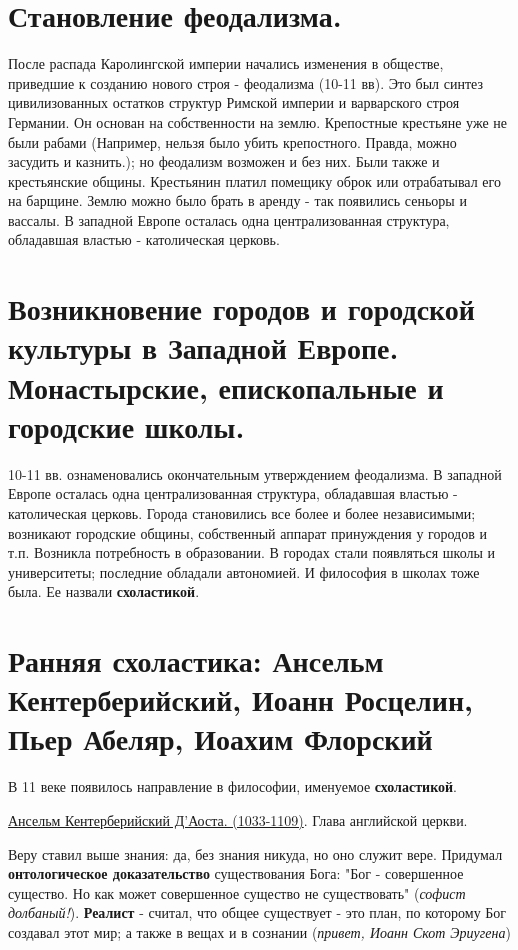 \documentclass[12pt,a4paper]{article}
\begin{document}
\section{Становление феодализма.}
После распада Каролингской империи начались изменения в обществе, приведшие к созданию нового строя - феодализма (10-11 вв). Это был синтез цивилизованных остатков структур Римской империи и варварского строя Германии. 
Он основан на собственности на землю. Крепостные крестьяне уже не были рабами (Например, нельзя было убить крепостного. Правда, можно засудить и казнить.); но феодализм возможен и без них. Были также и крестьянские общины. Крестьянин платил помещику оброк или отрабатывал его на барщине. Землю можно было брать в аренду - так появились сеньоры и вассалы. В западной Европе осталась одна централизованная структура, обладавшая властью - католическая церковь.


\section{Возникновение городов и городской культуры в Западной Европе. Монастырские, епископальные и городские школы.}
10-11 вв. ознаменовались окончательным утверждением феодализма. 
В западной Европе осталась одна централизованная структура, обладавшая властью - католическая церковь.
Города становились все более и более независимыми; возникают городские общины, собственный аппарат принуждения у городов и т.п.
Возникла потребность в образовании. В городах стали появляться школы и университеты; последние обладали автономией. И философия в школах тоже была. Ее назвали \textbf{схоластикой}. 

\section{Ранняя схоластика: Ансельм Кентерберийский, Иоанн Росцелин, Пьер Абеляр, Иоахим Флорский}
В 11 веке появилось направление в философии, именуемое \textbf{схоластикой}. 

\underline{Ансельм Кентерберийский Д'Аоста. (1033-1109)}. Глава английской церкви.

Веру ставил выше знания: да, без знания никуда, но оно служит вере. Придумал \textbf{онтологическое доказательство} существования Бога: "Бог - совершенное существо. Но как может совершенное существо не существовать" (\textit{софист долбаный!}). \textbf{Реалист} - считал, что общее существует  - это план, по которому Бог создавал этот мир; а также в вещах и в сознании (\textit{привет, Иоанн Скот Эриугена})
\end{document}
